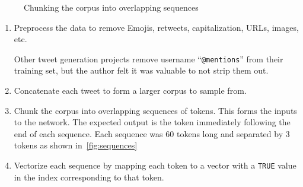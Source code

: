 \documentclass[letterpaper]{article}
\begin{document}
        \begin{figure}[H]
            \centering
            \caption{Chunking the corpus into overlapping sequences}\label{fig:sequences}
        \end{figure}

        \begin{enumerate}
            \item Preprocess the data to remove Emojis, retweets, capitalization, URLs, images, etc.

            Other tweet generation projects remove username ``\texttt{@mentions}'' from their training set, but the author felt it was valuable to not strip them out.

            \item Concatenate each tweet to form a larger corpus to sample from.
            \item Chunk the corpus into overlapping sequences of tokens. This forms the inputs to the network. The expected output is the token immediately following the end of each sequence. Each sequence was 60 tokens long and separated by 3 tokens as shown in~\autoref{fig:sequences}
            \item Vectorize each sequence by mapping each token to a vector with a \texttt{TRUE} value in the index corresponding to that token.
        \end{enumerate}
\end{document}
